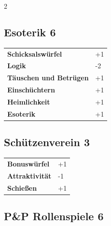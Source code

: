 \begin{multicols}{2}
\begin{tcolorbox}
    \subsection*{Esoterik \hfill \small{6 }}
    \tcblower




\begin{tabular}{@{}ll@{}}
    \textbf{Schicksalswürfel} & +1\\
    \textbf{Logik} & -2\\
    \textbf{Täuschen und Betrügen} & +1\\
    \textbf{Einschüchtern} & +1\\
    \textbf{Heimlichkeit} & +1\\
    \textbf{Esoterik} & +1\\
\end{tabular}


\end{tcolorbox}

\begin{tcolorbox}
    \subsection*{Schützenverein \hfill \small{3 }}
    \tcblower




\begin{tabular}{@{}ll@{}}
    \textbf{Bonuswürfel} & +1\\
    \textbf{Attraktivität} & -1\\
    \textbf{Schießen} & +1\\
\end{tabular}


\end{tcolorbox}

\begin{tcolorbox}
    \subsection*{P\&P Rollenspiele \hfill \small{6 }}
    \tcblower





\end{tcolorbox}
\end{multicols}
